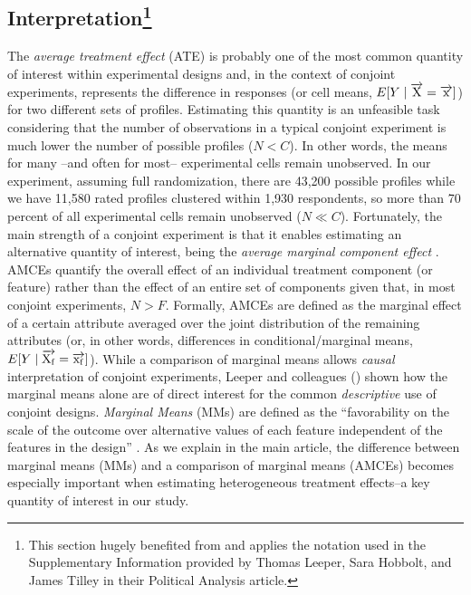 \subsection[Interpretation]{Interpretation\footnote{This section hugely benefited from and applies the notation used in the Supplementary Information provided by Thomas Leeper, Sara Hobbolt, and James Tilley in their \citeyear{Leeper2019} Political Analysis article.}}
\label{app:C21}
The \textit{average treatment effect} (ATE) is probably one of the most common quantity of interest within experimental designs \citep{Gerber2012} and, in the context of conjoint experiments, represents the difference in responses (or cell means, $E[Y\mid\overrightarrow{\rm X} = \overrightarrow{\rm x}]$) for two different sets of profiles. Estimating this quantity is an unfeasible task considering that the number of observations in a typical conjoint experiment is much lower the number of possible profiles ($N<C$). In other words, the means for many --and often for most-- experimental cells remain unobserved. In our experiment, assuming full randomization, there are 43,200 possible profiles while we have 11,580 rated profiles clustered within 1,930 respondents, so more than 70 percent of all experimental cells remain unobserved ($N \ll C$). Fortunately, the main strength of a conjoint experiment is that it enables estimating an alternative quantity of interest, being the \textit{average marginal component effect} \citep[AMCE;][]{Hainmueller2014a}. AMCEs quantify the overall effect of an individual treatment component (or feature) rather than the effect of an entire set of components given that, in most conjoint experiments, $N > F$. Formally, AMCEs are defined as the marginal effect of a certain attribute averaged over the joint distribution of the remaining attributes (or, in other words, differences in conditional/marginal means, $E[Y\mid\overrightarrow{\rm X_{f}} = \overrightarrow{\rm x_{f}} ]$). While a comparison of marginal means allows \textit{causal} interpretation of conjoint experiments, Leeper and colleagues (\citeyear{Leeper2019}) shown how the marginal means alone are of direct interest for the common \textit{descriptive} use of conjoint designs. \textit{Marginal Means} (MMs) are defined as the  ``favorability on the scale of the outcome over alternative values of each feature independent of the features in the design'' \citep[][, SI p.5]{Leeper2019}. As we explain in the main article, the difference between marginal means (MMs) and a comparison of marginal means (AMCEs) becomes especially important when estimating heterogeneous treatment effects--a key quantity of interest in our study.

